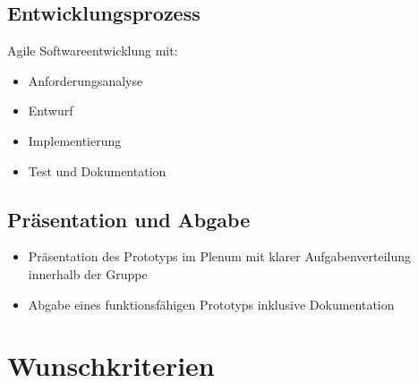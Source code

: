 \documentclass[%
	ngerman,
	12pt,
	a4paper
]{scrbook}
\begin{document}
	\subsection{Entwicklungsprozess}
	Agile Softwareentwicklung mit:
	\begin{itemize}
		\item Anforderungsanalyse
		\item Entwurf
		\item Implementierung
		\item Test und Dokumentation
	\end{itemize}
	\subsection{Präsentation und Abgabe}
	\begin{itemize}
		\item Präsentation des Prototyps im Plenum mit klarer Aufgabenverteilung innerhalb der Gruppe
		\item Abgabe eines funktionsfähigen Prototyps inklusive Dokumentation
	\end{itemize}

\section{Wunschkriterien}
\end{document}
